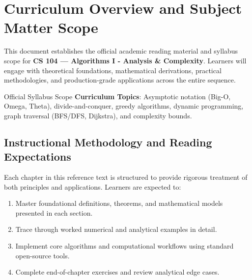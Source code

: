\section{Curriculum Overview and Subject Matter Scope}

This document establishes the official academic reading material and syllabus scope for \textbf{CS 104 --- Algorithms I - Analysis \& Complexity}. Learners will engage with theoretical foundations, mathematical derivations, practical methodologies, and production-grade applications across the entire sequence.

\begin{InsightBox}{Official Syllabus Scope}
  \textbf{Curriculum Topics}: Asymptotic notation (Big-O, Omega, Theta), divide-and-conquer, greedy algorithms, dynamic programming, graph traversal (BFS/DFS, Dijkstra), and complexity bounds.
\end{InsightBox}

\subsection{Instructional Methodology and Reading Expectations}

Each chapter in this reference text is structured to provide rigorous treatment of both principles and applications. Learners are expected to:
\begin{enumerate}
  \item Master foundational definitions, theorems, and mathematical models presented in each section.
  \item Trace through worked numerical and analytical examples in detail.
  \item Implement core algorithms and computational workflows using standard open-source tools.
  \item Complete end-of-chapter exercises and review analytical edge cases.
\end{enumerate}

